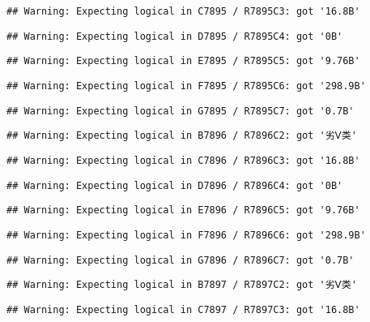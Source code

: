 \documentclass[
]{article}
\begin{document}
\begin{verbatim}
## Warning: Expecting logical in C7895 / R7895C3: got '16.8B'
\end{verbatim}

\begin{verbatim}
## Warning: Expecting logical in D7895 / R7895C4: got '0B'
\end{verbatim}

\begin{verbatim}
## Warning: Expecting logical in E7895 / R7895C5: got '9.76B'
\end{verbatim}

\begin{verbatim}
## Warning: Expecting logical in F7895 / R7895C6: got '298.9B'
\end{verbatim}

\begin{verbatim}
## Warning: Expecting logical in G7895 / R7895C7: got '0.7B'
\end{verbatim}

\begin{verbatim}
## Warning: Expecting logical in B7896 / R7896C2: got '劣Ⅴ类'
\end{verbatim}

\begin{verbatim}
## Warning: Expecting logical in C7896 / R7896C3: got '16.8B'
\end{verbatim}

\begin{verbatim}
## Warning: Expecting logical in D7896 / R7896C4: got '0B'
\end{verbatim}

\begin{verbatim}
## Warning: Expecting logical in E7896 / R7896C5: got '9.76B'
\end{verbatim}

\begin{verbatim}
## Warning: Expecting logical in F7896 / R7896C6: got '298.9B'
\end{verbatim}

\begin{verbatim}
## Warning: Expecting logical in G7896 / R7896C7: got '0.7B'
\end{verbatim}

\begin{verbatim}
## Warning: Expecting logical in B7897 / R7897C2: got '劣Ⅴ类'
\end{verbatim}

\begin{verbatim}
## Warning: Expecting logical in C7897 / R7897C3: got '16.8B'
\end{verbatim}
\end{document}
